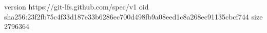 version https://git-lfs.github.com/spec/v1
oid sha256:23f2fb75c4f33d187e33b6286ec700d498fb9a08eed1c8a268ec91135cbcf744
size 2796364

